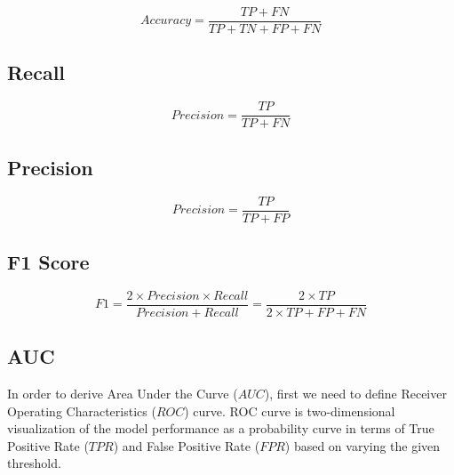 \begin{equation}\label{eq}
    Accuracy = \frac{TP + FN}{TP + TN + FP + FN}
\end{equation}

\subsection{Recall}

\begin{equation}\label{eq}
    Precision = \frac{TP}{TP + FN}
\end{equation}

\subsection{Precision}

\begin{equation}\label{eq}
    Precision = \frac{TP}{TP + FP}
\end{equation}

\subsection{F1 Score}

\begin{equation}\label{eq}
    F1 = \frac{2 \times Precision \times Recall}{Precision + Recall} = \frac{2 \times TP}{2 \times TP + FP + FN}
\end{equation}

\subsection{AUC}

In order to derive Area Under the Curve ($AUC$), first we need to define Receiver Operating Characteristics ($ROC$) curve.
ROC curve is two-dimensional visualization of the model performance as a probability curve in terms of True Positive Rate ($TPR$) and False Positive Rate ($FPR$) based on varying the given threshold.

